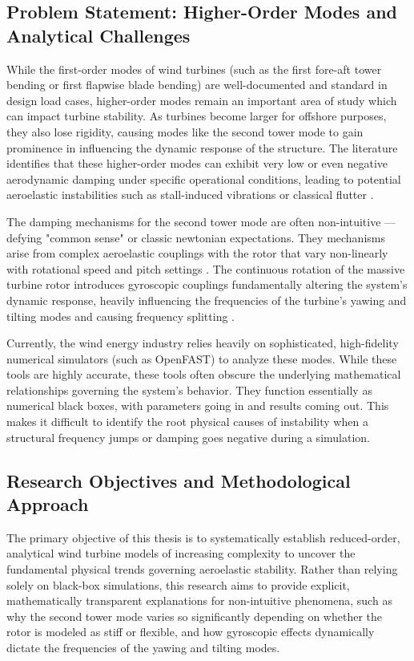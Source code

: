 \documentclass[onecolumn,draftcls]{IEEEtran}
\begin{document}
\subsection{Problem Statement: Higher-Order Modes and Analytical Challenges}
While the first-order modes of wind turbines (such as the first fore-aft tower bending or first flapwise blade bending) are well-documented and standard in design load cases, higher-order modes remain an important area of study which can impact turbine stability. As turbines become larger for offshore purposes, they also lose rigidity, causing modes like the second tower mode to gain prominence in influencing the dynamic response of the structure. The literature identifies that these higher-order modes can exhibit very low or even negative aerodynamic damping under specific operational conditions, leading to potential aeroelastic instabilities such as stall-induced vibrations or classical flutter \cite{hansen2007aeroelastic}.

The damping mechanisms for the second tower mode are often non-intuitive — defying "common sense" or classic newtonian expectations. They mechanisms arise from complex aeroelastic couplings with the rotor that vary non-linearly with rotational speed and pitch settings \cite{hansen2007aeroelastic}. The continuous rotation of the massive turbine rotor introduces gyroscopic couplings fundamentally altering the system's dynamic response, heavily influencing the frequencies of the turbine's yawing and tilting modes and causing frequency splitting \cite{hansen2003improved}.

Currently, the wind energy industry relies heavily on sophisticated, high-fidelity numerical simulators (such as OpenFAST) to analyze these modes. While these tools are highly accurate, these tools often obscure the underlying mathematical relationships governing the system's behavior. They function essentially as numerical black boxes, with parameters going in and results coming out. This makes it difficult to identify the root physical causes of instability when a structural frequency jumps or damping goes negative during a simulation.

\subsection{Research Objectives and Methodological Approach}
The primary objective of this thesis is to systematically establish reduced-order, analytical wind turbine models of increasing complexity to uncover the fundamental physical trends governing aeroelastic stability. Rather than relying solely on black-box simulations, this research aims to provide explicit, mathematically transparent explanations for non-intuitive phenomena, such as why the second tower mode varies so significantly depending on whether the rotor is modeled as stiff or flexible, and how gyroscopic effects dynamically dictate the frequencies of the yawing and tilting modes.
\end{document}
